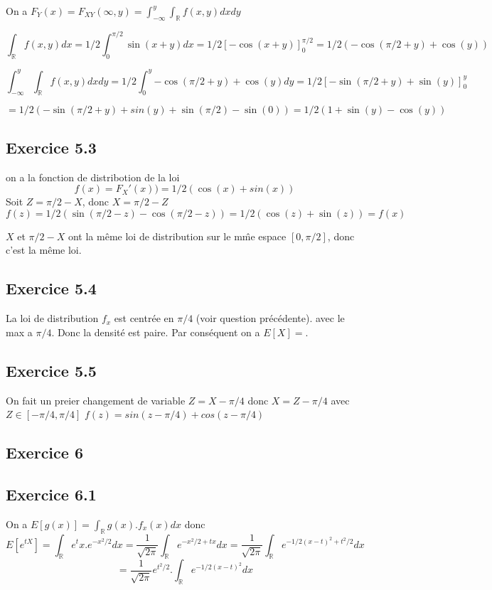 \documentclass[]{book}
\theoremstyle{definition}
\newcommand{\bb}[1]{\mathbb{#1}}
\newcommand{\R}{\bb{R}}
\begin{document}
On a $F_Y(x) = F_{XY}(\infty,y) = \int_{-\infty}^{y}{\int_{\R}{f(x,y)dx}dy}$

$$
\int_{\R}{f(x,y)dx} = 1/2 \int_{0}^{\pi/2}{\sin(x+y)dx} = 1/2 [-\cos(x+y)]_{0}^{\pi/2} = 1/2(-\cos(\pi/2+y) + \cos(y))
$$

$$
\int_{-\infty}^{y}{\int_{\R}{f(x,y)dx}dy} = 1/2 \int_{0}^{y}{-\cos(\pi/2+y) + \cos(y) dy} = 1/2 [-\sin(\pi/2+y)+\sin(y)]_{0}^{y} 
$$

$$
= 1/2(-\sin(\pi/2+y) + sin(y) + \sin(\pi/2) - \sin(0)) = 1/2(1+ \sin(y) - \cos(y))
$$

\subsection*{Exercice 5.3}
on a la fonction de distribotion de la loi 
$$
f(x) = F_X'(x)) = 1/2(\cos(x)+sin(x))
$$
Soit $Z = \pi/2-X$, donc $X = \pi/2-Z$
$$
f(z) = 1/2(\sin(\pi/2-z) - \cos(\pi/2-z)) = 1/2(\cos(z) + \sin(z)) = f(x)
$$

$X$ et $\pi/2-X$ ont la m\^eme loi de distribution sur le m\^me espace $[0,\pi/2]$, donc c'est la m\^eme loi.

\subsection*{Exercice 5.4}
La loi de distribution $f_x$ est centr\'ee en $\pi/4$ (voir question pr\'ec\'edente). avec le max a $\pi/4$. Donc la densit\'e est paire. Par cons\'equent on a $E[X] = $. 

\subsection*{Exercice 5.5}
On fait un preier changement de variable $Z = X-\pi/4$ donc $X = Z - \pi/4$ avec $Z \in [-\pi/4, \pi/4]$
$f(z) = sin(z-\pi/4) + cos(z-\pi/4)$



\subsection*{Exercice 6}
\subsection*{Exercice 6.1}
On a $E[g(x)] = \int_{\R}{g(x).f_x(x) dx}$ donc
$$
E[e^{tX}] = \int_{\R}{e^tx . e^{-x^2/2} dx} = \frac{1}{\sqrt{2\pi}}\int_{\R}{e^{-x^2/2+tx}dx} = \frac{1}{\sqrt{2\pi}}\int_{\R}{e^{-1/2(x-t)^2+t^2/2}dx}  
$$
$$
= \frac{1}{\sqrt{2\pi}}e^{t^2/2}.\int_{\R}{e^{-1/2(x-t)^2}dx}
$$
\end{document}
